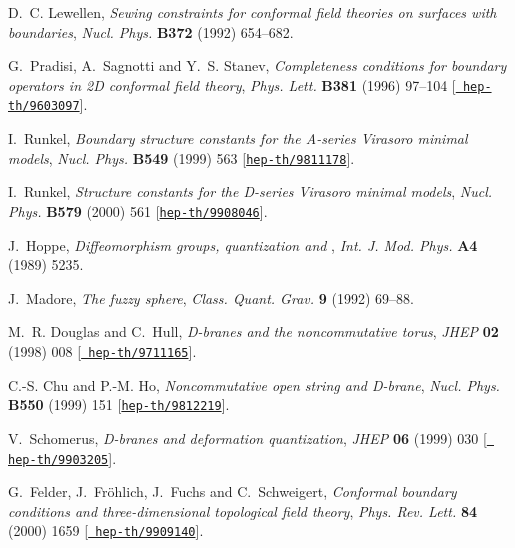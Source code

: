 \documentclass[12pt,a4paper]{article}
\begin{document}
\begin{thebibliography}{10}
D.~C. Lewellen, {\it Sewing constraints for conformal field theories on
  surfaces with boundaries},  {\em Nucl. Phys.} {\bf B372} (1992) 654--682.

G.~Pradisi, A.~Sagnotti and Y.~S. Stanev, {\it Completeness conditions for
  boundary operators in {2D} conformal field theory},  {\em Phys. Lett.} {\bf
  B381} (1996) 97--104 [\href{http://arXiv.org/abs/hep-th/9603097}{{\tt
  hep-th/9603097}}].

I.~Runkel, {\it Boundary structure constants for the {A-series} {Virasoro}
  minimal models},  {\em Nucl. Phys.} {\bf B549} (1999) 563
  [\href{http://arXiv.org/abs/hep-th/9811178}{{\tt hep-th/9811178}}].

I.~Runkel, {\it Structure constants for the {D-series} {Virasoro} minimal
  models},  {\em Nucl. Phys.} {\bf B579} (2000) 561
  [\href{http://arXiv.org/abs/hep-th/9908046}{{\tt hep-th/9908046}}].

J.~Hoppe, {\it Diffeomorphism groups, quantization and {\coordHE{}}},  {\em
  Int. J. Mod. Phys.} {\bf A4} (1989) 5235.

J.~Madore, {\it The fuzzy sphere},  {\em Class. Quant. Grav.} {\bf 9} (1992)
  69--88.

M.~R. Douglas and C.~Hull, {\it D-branes and the noncommutative torus},  {\em
  JHEP} {\bf 02} (1998) 008 [\href{http://arXiv.org/abs/hep-th/9711165}{{\tt
  hep-th/9711165}}].

C.-S. Chu and P.-M. Ho, {\it Noncommutative open string and {D-brane}},  {\em
  Nucl. Phys.} {\bf B550} (1999) 151
  [\href{http://arXiv.org/abs/hep-th/9812219}{{\tt hep-th/9812219}}].

V.~Schomerus, {\it D-branes and deformation quantization},  {\em JHEP} {\bf 06}
  (1999) 030 [\href{http://arXiv.org/abs/hep-th/9903205}{{\tt
  hep-th/9903205}}].

G.~Felder, J.~{Fr\"ohlich}, J.~Fuchs and C.~Schweigert, {\it Conformal boundary
  conditions and three-dimensional topological field theory},  {\em Phys. Rev.
  Lett.} {\bf 84} (2000) 1659 [\href{http://arXiv.org/abs/hep-th/9909140}{{\tt
  hep-th/9909140}}].


\end{thebibliography}
\end{document}
